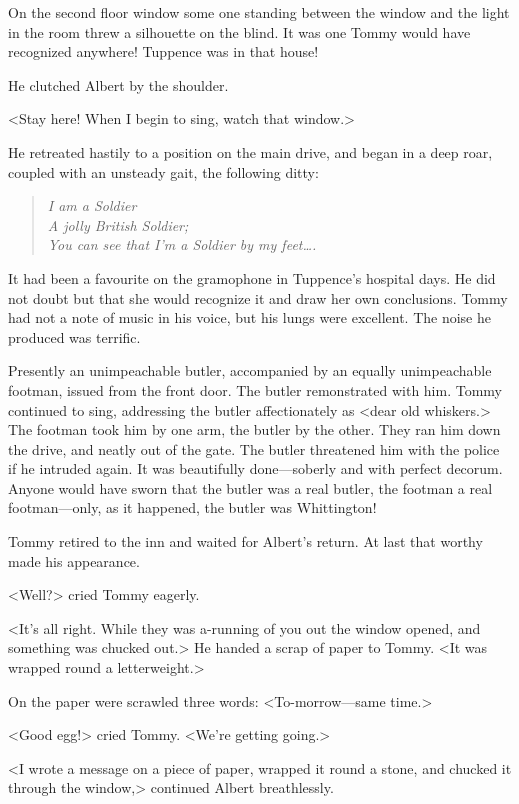 On the second floor window some one standing between the window and the light in the room threw a silhouette on the blind. It was one Tommy would have recognized anywhere! Tuppence was in that house!

He clutched Albert by the shoulder.

<Stay here! When I begin to sing, watch that window.>

He retreated hastily to a position on the main drive, and began in a deep roar, coupled with an unsteady gait, the following ditty:  

\begin{verse}\itshape
	I am a Soldier\\
	A jolly British Soldier;\\
	You can see that I'm a Soldier by my feet\dots.
\end{verse}

It had been a favourite on the gramophone in Tuppence's hospital days. He did not doubt but that she would recognize it and draw her own conclusions. Tommy had not a note of music in his voice, but his lungs were excellent. The noise he produced was terrific.

Presently an unimpeachable butler, accompanied by an equally unimpeachable footman, issued from the front door. The butler remonstrated with him. Tommy continued to sing, addressing the butler affectionately as <dear old whiskers.> The footman took him by one arm, the butler by the other. They ran him down the drive, and neatly out of the gate. The butler threatened him with the police if he intruded again. It was beautifully done—soberly and with perfect decorum. Anyone would have sworn that the butler was a real butler, the footman a real footman—only, as it happened, the butler was Whittington!

Tommy retired to the inn and waited for Albert's return. At last that worthy made his appearance.

<Well?> cried Tommy eagerly.

<It's all right. While they was a-running of you out the window opened, and something was chucked out.> He handed a scrap of paper to Tommy. <It was wrapped round a letterweight.>

On the paper were scrawled three words: <To-morrow—same time.>

<Good egg!> cried Tommy. <We're getting going.>

<I wrote a message on a piece of paper, wrapped it round a stone, and chucked it through the window,> continued Albert breathlessly.

